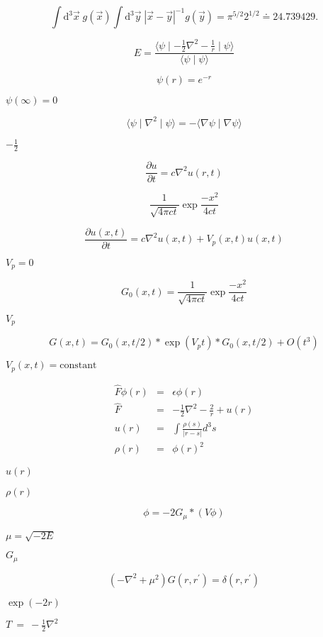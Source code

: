 \documentclass{article}
\begin{document}
\[ \int \mathrm{d}^3 \vec{x} \; g(\vec{x}) \int \mathrm{d}^3 \vec{y} \; |\vec{x}-\vec{y}|^{-1} g(\vec{y}) = \pi^{5/2} 2^{1/2} \doteq 24.739429. \]
\pagebreak

\[ E = \frac{\langle \psi \mid - \frac{1}{2} \nabla^2 - \frac{1}{r} \mid \psi \rangle}{\langle \psi \mid \psi \rangle} \]
\pagebreak

\[ \psi(r) = e^{-r} \]
\pagebreak

$ \psi(\infty)=0 $
\pagebreak

\[ \langle \psi \mid \nabla^2 \mid \psi \rangle = - \langle \nabla \psi \mid \nabla \psi \rangle \]
\pagebreak

$-\frac{1}{2}$
\pagebreak

\[ \frac{\partial u}{\partial t} = c \nabla^2 u(r,t) \]
\pagebreak

\[ \frac{1}{\sqrt{4 \pi c t}} \exp \frac{-x^2}{4 c t} \]
\pagebreak

\[ \frac{\partial u(x,t)}{\partial t} = c \nabla^2 u(x,t) + V_p(x,t) u(x,t) \]
\pagebreak

$ V_p = 0 $
\pagebreak

\[ G_0(x,t) = \frac{1}{\sqrt{4 \pi c t}} \exp \frac{-x^2}{4 c t} \]
\pagebreak

$ V_p $
\pagebreak

\[ G(x,t) = G_0(x,t/2) * \exp(V_p t) * G_0(x,t/2) + O(t^3) \]
\pagebreak

$ V_p(x,t)=\mbox{constant} $
\pagebreak

\begin{eqnarray*} \hat{F} \phi(r) &=& \epsilon \phi(r) \\ \hat{F} &=& -\frac{1}{2} \nabla^2 - \frac{2}{r} + u(r) \\ u(r) &=& \int \frac{\rho(s)}{| r - s |} d^3s \\ \rho(r) &=& \phi(r)^2 \end{eqnarray*}
\pagebreak

$ u(r) $
\pagebreak

$ \rho(r) $
\pagebreak

\[ \phi = - 2 G_{\mu} * ( V \phi) \]
\pagebreak

$ \mu = \sqrt{-2E} $
\pagebreak

$G_{\mu}$
\pagebreak

\[ \left( - \nabla^2 + \mu^2 \right) G(r,r^{\prime}) = \delta(r,r^{\prime}) \]
\pagebreak

$ \exp(-2r) $
\pagebreak

$T~=~-\frac{1}{2} \nabla^2 $
\pagebreak
\end{document}
